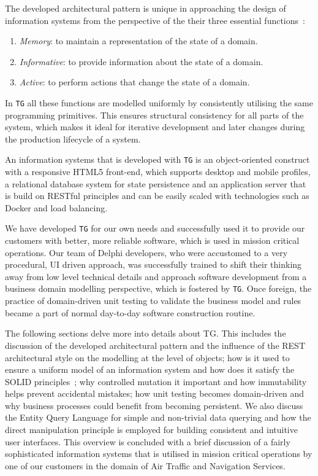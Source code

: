 \documentclass[a4paper,12pt,oneside,openright,final]{memoir} %
\begin{document}
	The developed architectural pattern is unique in approaching the design of information systems from the perspective of the their three essential functions~\cite{oli2007}:
	\begin{enumerate}
    	\item \emph{Memory}: to maintain a representation of the state of a domain.
    	\item \emph{Informative}: to provide information about the state of a domain.
    	\item \emph{Active}: to perform actions that change the state of a domain. 
	\end{enumerate}  	
	In \texttt{TG} all these functions are modelled uniformly by consistently utilising the same programming primitives.
	This ensures structural consistency for all parts of the system, which makes it ideal for iterative development and later changes during the production lifecycle of a system.
		
	An information systems that is developed with \texttt{TG} is an object-oriented construct with a responsive HTML5 front-end, which supports desktop and mobile profiles, a relational database system for state persistence and an application server that is build on RESTful principles and can be easily scaled with technologies such as Docker and load balancing.
	
	We have developed \texttt{TG} for our own needs and successfully used it to provide our customers with better, more reliable software, which is used in mission critical operations.
	Our team of Delphi developers, who were accustomed to a very procedural, UI driven approach, was successfully trained to shift their thinking away from low level technical details and approach software development from a business domain modelling perspective, which is fostered by \texttt{TG}.
	Once foreign, the practice of domain-driven unit testing to validate the business model and rules became a part of normal day-to-day software construction routine.
	
	
	The following sections delve more into details about TG.
	This includes the discussion of the developed architectural pattern and the influence of the REST architectural style on the modelling at the level of objects; how is it used to ensure a uniform model of an information system and how does it satisfy the SOLID principles~\cite{SOLID}; why controlled mutation it important and how immutability helps prevent accidental mistakes; how unit testing becomes domain-driven and why business processes could benefit from becoming persistent.
	We also discuss the Entity Query Language for simple and non-trivial data querying and how the direct manipulation principle is employed for building consistent and intuitive user interfaces.
	This overview is concluded with a brief discussion of a fairly sophisticated information systems that is utilised in mission critical operations by one of our customers in the domain of Air Traffic and Navigation Services.
\end{document}
